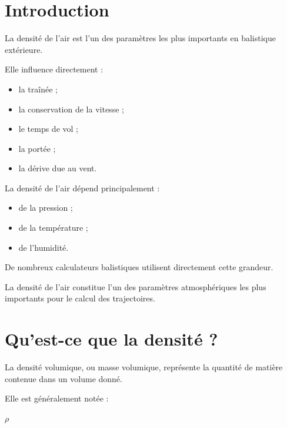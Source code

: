 
\section{Introduction}

La densité de l'air est l'un des paramètres les plus importants en
balistique extérieure.

Elle influence directement :

\begin{itemize}
\item la traînée ;
\item la conservation de la vitesse ;
\item le temps de vol ;
\item la portée ;
\item la dérive due au vent.
\end{itemize}

La densité de l'air dépend principalement :

\begin{itemize}
\item de la pression ;
\item de la température ;
\item de l'humidité.
\end{itemize}

De nombreux calculateurs balistiques utilisent directement cette grandeur.

\begin{aretenir}

La densité de l'air constitue l'un des paramètres atmosphériques les plus
importants pour le calcul des trajectoires.

\end{aretenir}

\section{Qu'est-ce que la densité ?}

La densité volumique, ou masse volumique, représente la quantité de matière
contenue dans un volume donné.

Elle est généralement notée :

\begin{center}$\rho$\end{center}

